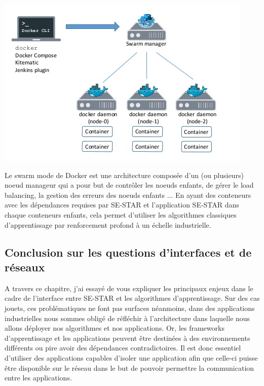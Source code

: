 \begin{center}
\includegraphics[scale=.4]{./assets/interfaceReseau/docker}
\end{center}


Le swarm mode de Docker est une architecture composée d'un (ou plusieurs) noeud manageur qui a pour but de contrôler les noeuds enfants, de gérer le load balancing, la gestion des erreurs des noeuds enfants ... En ayant des conteneurs avec les dépendances requises par SE-STAR et l'application SE-STAR dans chaque conteneurs enfants, cela permet d'utiliser les algorithmes classiques d'apprentissage par renforcement profond à un échelle industrielle.

\subsection{Conclusion sur les questions d'interfaces et de réseaux}

A travers ce chapitre, j'ai essayé de vous expliquer les principaux enjeux dans le cadre de l'interface entre SE-STAR et les algorithmes d'apprentissage. Sur des cas jouets, ces problématiques ne font pas surfaces néanmoins, dans des applications industrielles nous sommes obligé de réfléchir à l'architecture dans laquelle nous allons déployer nos algorithmes et nos applications. Or, les \gls{frameworks} d'apprentissage et les applications peuvent être destinées à des environnements différents ou pire avoir des dépendances contradictoires. Il est donc essentiel  d'utiliser des applications capables d'isoler une application afin que celle-ci puisse être  disponible sur le réseau dans le but de pouvoir permettre la communication entre les applications.

